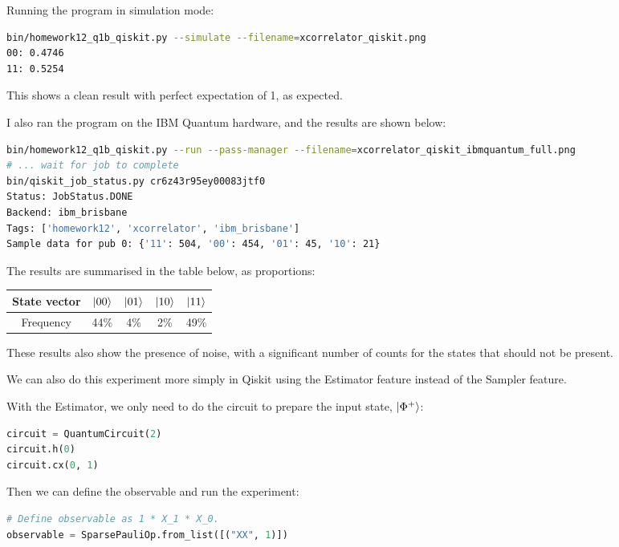 \documentclass[12pt]{extarticle}
\begin{document}
\begin{enumerate}[(a)]
Running the program in simulation mode:

\begin{lstlisting}[language=bash]
bin/homework12_q1b_qiskit.py --simulate --filename=xcorrelator_qiskit.png
00: 0.4746
11: 0.5254
\end{lstlisting}

This shows a clean result with perfect expectation of 1, as expected.

I also ran the program on the IBM Quantum hardware, and the results are shown below:

\begin{lstlisting}[language=bash]
bin/homework12_q1b_qiskit.py --run --pass-manager --filename=xcorrelator_qiskit_ibmquantum_full.png
# ... wait for job to complete
bin/qiskit_job_status.py cr6z43r95ey00083jtf0
Status: JobStatus.DONE
Backend: ibm_brisbane
Tags: ['homework12', 'xcorrelator', 'ibm_brisbane']
Sample data for pub 0: {'11': 504, '00': 454, '01': 45, '10': 21}
\end{lstlisting}

The results are summarised in the table below, as proportions:

\begin{center}
\begin{tabular}{|c|c|c|c|c|}
\hline
State vector & $\ket{00}$ & $\ket{01}$ & $\ket{10}$ & $\ket{11}$ \\
\hline
Frequency & 44\% &  4\% &  2\% & 49\% \\
\hline
\end{tabular}
\end{center}

These results also show the presence of noise, with a significant number of counts for the states that should not be present.

We can also do this experiment more simply in Qiskit using the Estimator feature instead of the Sampler feature.

With the Estimator, we only need to do the circuit to prepare the input state, $\ket{\Phi^{+}}$:
\begin{lstlisting}[language=python]
circuit = QuantumCircuit(2)
circuit.h(0)
circuit.cx(0, 1)
\end{lstlisting}
Then we can define the observable and run the experiment:
\begin{lstlisting}[language=python]
# Define observable as 1 * X_1 * X_0.
observable = SparsePauliOp.from_list([("XX", 1)])
\end{lstlisting}


\end{enumerate}
\end{document}
